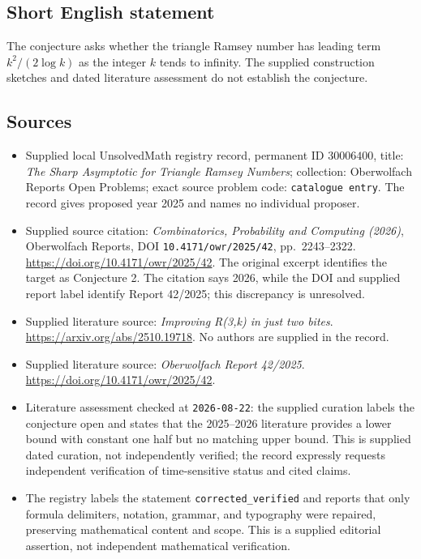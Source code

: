\documentclass[11pt]{article}
\begin{document}
\subsection{Short English statement}
The conjecture asks whether the triangle Ramsey number has leading term \(k^2/(2\log k)\) as the integer \(k\) tends to infinity. The supplied construction sketches and dated literature assessment do not establish the conjecture.
\subsection{Sources}
\begin{itemize}
\item Supplied local UnsolvedMath registry record, permanent ID \(30006400\), title: \emph{The Sharp Asymptotic for Triangle Ramsey Numbers}; collection: Oberwolfach Reports Open Problems; exact source problem code: \texttt{catalogue entry}. The record gives proposed year 2025 and names no individual proposer.
\item Supplied source citation: \emph{Combinatorics, Probability and Computing (2026)}, Oberwolfach Reports, DOI \texttt{10.4171/owr/2025/42}, pp.\ 2243--2322. \url{https://doi.org/10.4171/owr/2025/42}. The original excerpt identifies the target as Conjecture 2. The citation says 2026, while the DOI and supplied report label identify Report 42/2025; this discrepancy is unresolved.
\item Supplied literature source: \emph{Improving R(3,k) in just two bites}. \url{https://arxiv.org/abs/2510.19718}. No authors are supplied in the record.
\item Supplied literature source: \emph{Oberwolfach Report 42/2025}. \url{https://doi.org/10.4171/owr/2025/42}.
\item Literature assessment checked at \texttt{2026-08-22}: the supplied curation labels the conjecture open and states that the 2025--2026 literature provides a lower bound with constant one half but no matching upper bound. This is supplied dated curation, not independently verified; the record expressly requests independent verification of time-sensitive status and cited claims.
\item The registry labels the statement \texttt{corrected\_verified} and reports that only formula delimiters, notation, grammar, and typography were repaired, preserving mathematical content and scope. This is a supplied editorial assertion, not independent mathematical verification.
\end{itemize}
\end{document}
